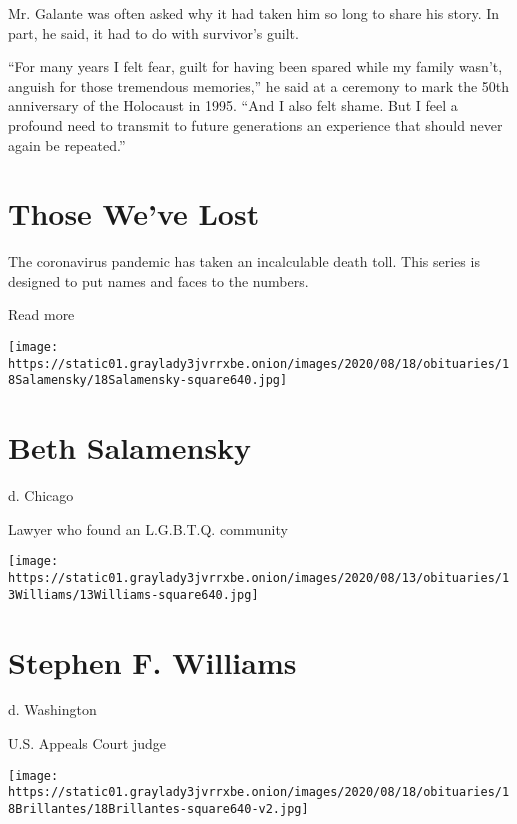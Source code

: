Mr. Galante was often asked why it had taken him so long to share his
story. In part, he said, it had to do with survivor's guilt.

``For many years I felt fear, guilt for having been spared while my
family wasn't, anguish for those tremendous memories,'' he said at a
ceremony to mark the 50th anniversary of the Holocaust in 1995. ``And I
also felt shame. But I feel a profound need to transmit to future
generations an experience that should never again be repeated.''

\href{https://www.nytimes3xbfgragh.onion/interactive/2020/obituaries/people-died-coronavirus-obituaries.html?action=click\&pgtype=Article\&state=default\&region=BELOW_MAIN_CONTENT\&context=covid_obits_promo}{}

\hypertarget{those-weve-lost}{%
\section{Those We've Lost}\label{those-weve-lost}}

The coronavirus pandemic has taken an incalculable death toll. This
series is designed to put names and faces to the numbers.

Read more

\texttt{[image: https://static01.graylady3jvrrxbe.onion/images/2020/08/18/obituaries/18Salamensky/18Salamensky-square640.jpg]}

\hypertarget{beth-salamensky}{%
\section{Beth Salamensky}\label{beth-salamensky}}

d. Chicago

Lawyer who found an L.G.B.T.Q. community

\texttt{[image: https://static01.graylady3jvrrxbe.onion/images/2020/08/13/obituaries/13Williams/13Williams-square640.jpg]}

\hypertarget{stephen-f-williams}{%
\section{Stephen F. Williams}\label{stephen-f-williams}}

d. Washington

U.S. Appeals Court judge

\texttt{[image: https://static01.graylady3jvrrxbe.onion/images/2020/08/18/obituaries/18Brillantes/18Brillantes-square640-v2.jpg]}

